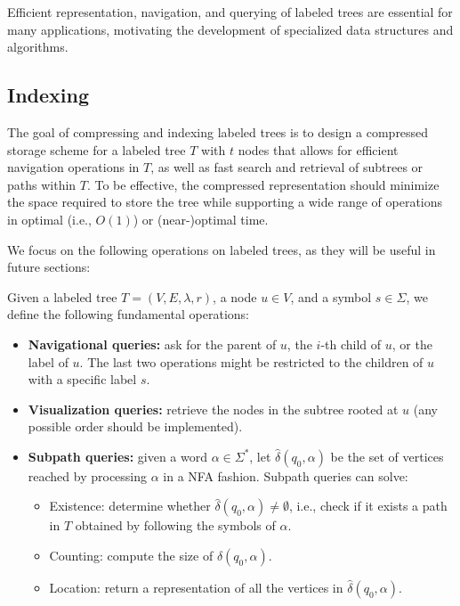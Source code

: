 Efficient representation, navigation, and querying of labeled trees are essential for many applications, motivating the development of specialized data structures and algorithms. 

\subsection{Indexing} \label{compandindexinglabtree}
The goal of compressing and indexing labeled trees is to design a compressed storage scheme for a labeled tree $T$ with $t$ nodes that allows for efficient navigation operations in $T$, as well as fast search and retrieval of subtrees or paths within $T$. To be effective, the compressed representation should minimize the space required to store the tree while supporting a wide range of operations in optimal (i.e., $O(1)$) or (near-)optimal time.

We focus on the following operations on labeled trees, as they will be useful in future sections:
\begin{definition} \label{def:tree_operations}
Given a labeled tree $T = (V, E, \lambda, r)$, a node $u \in V$, and a symbol $s \in \Sigma$, we define the following fundamental operations:

\begin{itemize}
    \item \textbf{Navigational queries:} ask for the parent of $u$, the $i$-th child of $u$, or the label of $u$. The last two operations might be restricted to the children of $u$ with a specific label $s$.
    \item \textbf{Visualization queries:} retrieve the nodes in the subtree rooted at $u$ (any possible order should be implemented).
    \item \textbf{Subpath queries:} given a word $\alpha \in \Sigma^*$, let $\hat\delta(q_0,\alpha)$ be the set of vertices reached by processing $\alpha$ in a NFA fashion. Subpath queries can solve:
    \begin{itemize}
        \item Existence: determine whether $\hat\delta(q_0,\alpha) \neq \emptyset$, i.e., check if it exists a path in $T$ obtained by following the symbols of $\alpha$.
        \item Counting: compute the size of $\hat\delta(q_0,\alpha)$.
        \item Location: return a representation of all the vertices in $\hat\delta(q_0,\alpha)$. 
    \end{itemize}
\end{itemize}
\end{definition}

